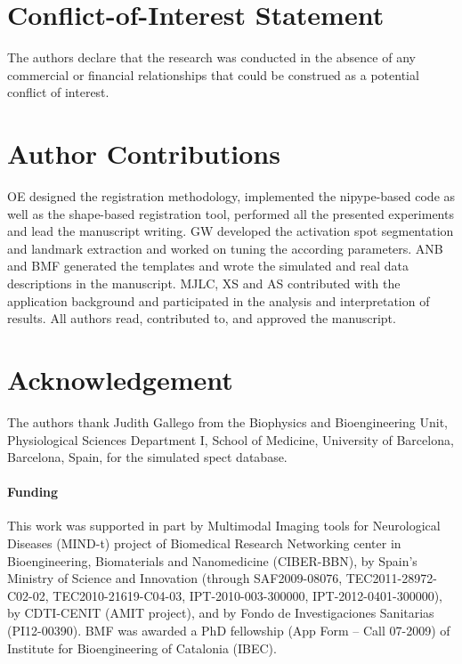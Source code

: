 \documentclass{frontiers}
\begin{document}
\section*{Conflict-of-Interest Statement}
The authors declare that the research was conducted in the absence of any commercial or financial relationships 
that could be construed as a potential conflict of interest.

\section*{Author Contributions}
OE designed the registration methodology, implemented the \gls*{nipype}-based code
  as well as the shape-based registration tool, performed all the presented experiments
  and lead the manuscript writing.
GW developed the activation spot segmentation and landmark extraction
  and worked on tuning the according parameters.
ANB and BMF generated the templates and wrote the simulated and real data
  descriptions in the manuscript.
MJLC, XS and AS contributed with the application background and participated
  in the analysis and interpretation of results.
All authors read, contributed to, and approved the manuscript.

\section*{Acknowledgement}
The authors thank Judith Gallego from the Biophysics and Bioengineering Unit, Physiological Sciences Department I,
School of Medicine, University of Barcelona, Barcelona, Spain, for the simulated \gls*{spect} database.
\paragraph{Funding\textcolon} This work was supported in part by Multimodal Imaging tools for Neurological Diseases (MIND-t) 
  project of Biomedical Research Networking center in Bioengineering, Biomaterials and Nanomedicine (CIBER-BBN), 
  by Spain's Ministry of Science and Innovation (through SAF2009-08076, TEC2011-28972-C02-02, TEC2010-21619-C04-03,
  IPT-2010-003-300000, IPT-2012-0401-300000), by CDTI-CENIT (AMIT project), and by Fondo de Investigaciones Sanitarias (PI12-00390).
BMF was awarded a PhD fellowship (App Form – Call 07-2009) of Institute for Bioengineering of Catalonia (IBEC).

\end{document}
